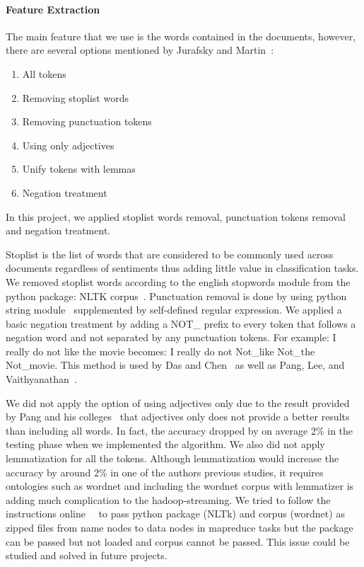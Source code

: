 \paragraph{Feature Extraction}
The main feature that we use is the words contained in the documents, 
however, there are several options mentioned by Jurafsky and 
Martin~\cite{hid-sp18-405-sentiment-jurafsky2009}: 
\begin{enumerate}
	\item All tokens
	\item Removing stoplist words
	\item Removing punctuation tokens
	\item Using only adjectives
	\item Unify tokens with lemmas
	\item Negation treatment
\end{enumerate}
In this project, we applied stoplist words removal, punctuation tokens 
removal and negation treatment. 

Stoplist is the list of words that are considered to be commonly used across 
documents regardless of sentiments thus adding little value in classification 
tasks. We removed stoplist words according to the english stopwords 
module from the python package: NLTK 
corpus~\cite{hid-sp18-405-sentiment-stopworddoc}. Punctuation removal is 
done by using python string 
module~\cite{hid-sp18-405-sentiment-punctuationdoc} supplemented by 
self-defined regular expression. We applied a basic negation treatment by 
adding a NOT\_ prefix to every token that follows a negation word and not 
separated by any punctuation tokens. For example: I really do not like the 
movie becomes: I really do not Not\_like Not\_the Not\_movie. This method is 
used by Das and Chen~\cite{hid-sp18-405-sentiment-das2001yahoo} as well 
as Pang, Lee, and 
Vaithyanathan~\cite{hid-sp18-405-sentiment-pang2002thumbs}. 

We did not apply the option of using adjectives only due to the result 
provided by Pang and his 
colleges~\cite{hid-sp18-405-sentiment-pang2004asentimental} that  
adjectives only does not provide a better results than including all words. In 
fact, the accuracy dropped by on average 2\% in the testing phase when we 
implemented the algorithm. We also did not apply lemmatization for all the 
tokens. Although lemmatization would increase the accuracy by around 2\% 
in one of the authors previous studies, it requires ontologies such as 
wordnet and including the wordnet corpus with lemmatizer is adding much 
complication to the hadoop-streaming. We tried to follow the instructions 
online~\cite{hid-sp18-405-hadoopstreaming-nltk}~\cite{hid-sp18-405-hadoopstreaming-corpus}
 to pass python package (NLTk) and corpus (wordnet) as zipped files from 
name nodes to data nodes in mapreduce tasks but the package can be 
passed but not loaded and corpus cannot be passed. This issue could be 
studied and solved in future projects. 

